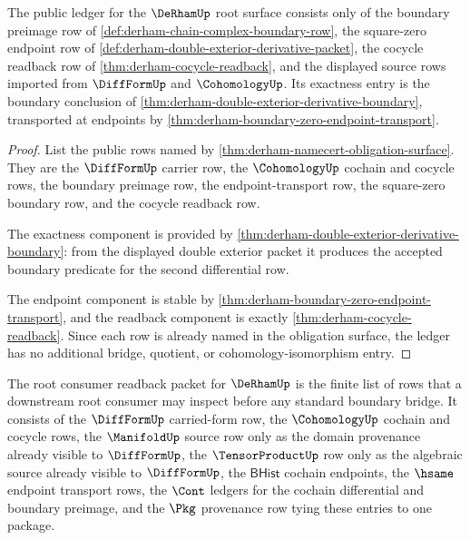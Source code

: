 \begin{theorem}
\label{thm:derham-root-ledger-exactness}
The public ledger for the $\DeRhamUp$ root surface consists only of the
boundary preimage row of \autoref{def:derham-chain-complex-boundary-row}, the
square-zero endpoint row of
\autoref{def:derham-double-exterior-derivative-packet}, the cocycle readback
row of \autoref{thm:derham-cocycle-readback}, and the displayed source rows
imported from $\DiffFormUp$ and $\CohomologyUp$. Its exactness entry is the
boundary conclusion of
\autoref{thm:derham-double-exterior-derivative-boundary}, transported at
endpoints by \autoref{thm:derham-boundary-zero-endpoint-transport}.
\end{theorem}
\begin{proof}
List the public rows named by
\autoref{thm:derham-namecert-obligation-surface}. They are the
$\DiffFormUp$ carrier row, the $\CohomologyUp$ cochain and cocycle rows, the
boundary preimage row, the endpoint-transport row, the square-zero boundary
row, and the cocycle readback row.

The exactness component is provided by
\autoref{thm:derham-double-exterior-derivative-boundary}: from the displayed
double exterior packet it produces the accepted boundary predicate for the
second differential row.

The endpoint component is stable by
\autoref{thm:derham-boundary-zero-endpoint-transport}, and the readback
component is exactly \autoref{thm:derham-cocycle-readback}. Since each row is
already named in the obligation surface, the ledger has no additional bridge,
quotient, or cohomology-isomorphism entry.
\end{proof}

\begin{definition}
\label{def:derham-root-consumer-readback-packet}
The root consumer readback packet for $\DeRhamUp$ is the finite list of rows
that a downstream root consumer may inspect before any standard boundary
bridge. It consists of the $\DiffFormUp$ carried-form row, the
$\CohomologyUp$ cochain and cocycle rows, the $\ManifoldUp$ source row only as
the domain provenance already visible to $\DiffFormUp$, the
$\TensorProductUp$ row only as the algebraic source already visible to
$\DiffFormUp$, the $\mathsf{BHist}$ cochain endpoints, the $\hsame$ endpoint
transport rows, the $\Cont$ ledgers for the cochain differential and boundary
preimage, and the $\Pkg$ provenance row tying these entries to one package.
\end{definition}

